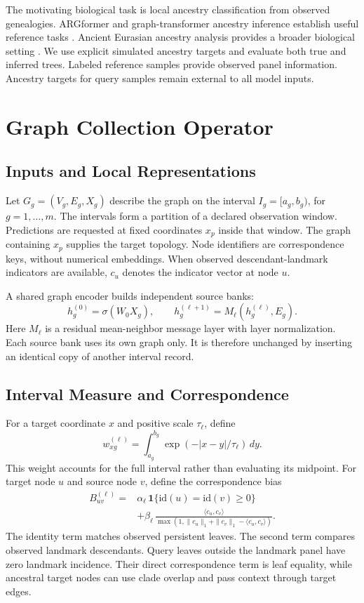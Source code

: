 \documentclass[letterpaper]{article}
\begin{document}
The motivating biological task is local ancestry classification from observed genealogies. ARGformer and graph-transformer ancestry inference establish useful reference tasks \citep{argformer2026,ancientancestry2026}. Ancient Eurasian ancestry analysis provides a broader biological setting \citep{eurasians2024}. We use explicit simulated ancestry targets and evaluate both true and inferred trees. Labeled reference samples provide observed panel information. Ancestry targets for query samples remain external to all model inputs.

\section{Graph Collection Operator}
\subsection{Inputs and Local Representations}
Let $G_g=(V_g,E_g,X_g)$ describe the graph on the interval $I_g=[a_g,b_g)$, for $g=1,\ldots,m$. The intervals form a partition of a declared observation window. Predictions are requested at fixed coordinates $x_p$ inside that window. The graph containing $x_p$ supplies the target topology. Node identifiers are correspondence keys, without numerical embeddings. When observed descendant-landmark indicators are available, $c_u$ denotes the indicator vector at node $u$.

A shared graph encoder builds independent source banks:
\begin{equation}
 h_g^{(0)}=\sigma(W_0 X_g),\qquad
 h_g^{(\ell+1)}=M_\ell(h_g^{(\ell)},E_g).
\end{equation}
Here $M_\ell$ is a residual mean-neighbor message layer with layer normalization. Each source bank uses its own graph only. It is therefore unchanged by inserting an identical copy of another interval record.

\subsection{Interval Measure and Correspondence}
For a target coordinate $x$ and positive scale $\tau_\ell$, define
\begin{equation}
 w_{xg}^{(\ell)}=\int_{a_g}^{b_g}
       \exp(-|x-y|/\tau_\ell)\,dy.
\end{equation}
This weight accounts for the full interval rather than evaluating its midpoint. For target node $u$ and source node $v$, define the correspondence bias
\begin{align}
 B_{uv}^{(\ell)}={}&\alpha_\ell\,\mathbf{1}\{\mathrm{id}(u)=\mathrm{id}(v)\geq0\}\nonumber\\
 &+\beta_\ell\,
 \frac{\langle c_u,c_v\rangle}
 {\max(1,\|c_u\|_1+\|c_v\|_1-\langle c_u,c_v\rangle)}.
\end{align}
The identity term matches observed persistent leaves. The second term compares observed landmark descendants. Query leaves outside the landmark panel have zero landmark incidence. Their direct correspondence term is leaf equality, while ancestral target nodes can use clade overlap and pass context through target edges.
\end{document}

